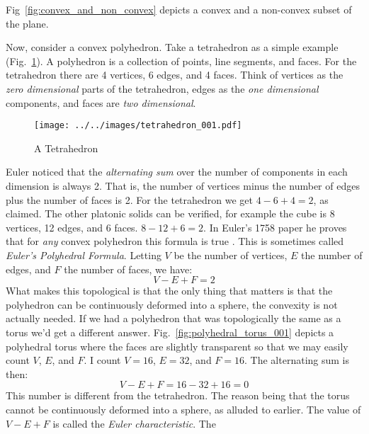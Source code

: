    Fig~\ref{fig:convex_and_non_convex} depicts a convex and a non-convex
    subset of the plane.
    \par\hfill\par
    Now, consider a convex polyhedron. Take a tetrahedron as a simple
    example (Fig.~\ref{fig:tetrahedron_001}). A polyhedron is a collection of
    points, line segments, and faces. For the tetrahedron there are 4 vertices,
    6 edges, and 4 faces. Think of vertices as the
    \textit{zero dimensional} parts of the tetrahedron, edges as the
    \textit{one dimensional} components, and faces are \textit{two dimensional}.
    \begin{figure}[H]
        \centering
        \texttt{[image: ../../images/tetrahedron\_001.pdf]}
        \caption{A Tetrahedron}
        \label{fig:tetrahedron_001}
    \end{figure}
    Euler noticed that the \textit{alternating sum} over the number
    of components in each dimension is always 2. That is, the number of
    vertices minus the number of edges plus the number of faces is 2. For the
    tetrahedron we get $4-6+4=2$, as claimed. The other platonic solids can be
    verified, for example the cube is 8 vertices, 12 edges, and 6 faces.
    $8-12+6=2$. In Euler's 1758 paper he proves that for \textit{any} convex
    polyhedron this formula is true \cite{LeonhardEulerPolyhedraFormula}. This
    is sometimes called \textit{Euler's Polyhedral Formula}. Letting $V$ be the
    number of vertices, $E$ the number of edges, and $F$ the number of faces,
    we have:
    \begin{equation}
        V-E+F=2
    \end{equation}
    What makes this topological is that the only thing that matters is that the
    polyhedron can be continuously deformed into a sphere, the convexity is not
    actually needed. If we had a polyhedron that was topologically the same as
    a torus we'd get a different answer.
    Fig.~\ref{fig:polyhedral_torus_001} depicts a polyhedral torus where the
    faces are slightly transparent so that we may easily count $V$, $E$, and
    $F$. I count $V=16$, $E=32$, and $F=16$. The alternating sum is then:
    \begin{equation}
        V-E+F=16-32+16=0
    \end{equation}
    This number is different from the tetrahedron. The reason being that the
    torus cannot be continuously deformed into a sphere, as alluded to earlier.
    The value of $V-E+F$ is called the \textit{Euler characteristic}. The
